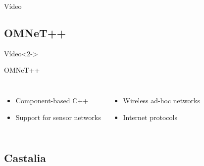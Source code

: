 \documentclass{beamer}
\begin{document}
\begin{frame}

\begin{exampleblock}{Vídeo}
	\centering
\end{exampleblock}
\end{frame}


\subsection{OMNeT++}

\begin{frame}

\begin{exampleblock}{Vídeo}<2->
	\centering
\end{exampleblock}

\begin{block}{OMNeT++}

\begin{columns}[c] %

	\begin{itemize}
		\item Component-based C++
		\item Support for sensor networks
	\end{itemize}
\begin{itemize}
		\item Wireless ad-hoc networks
		\item Internet protocols
	\end{itemize}
\end{columns}
\end{block}
\end{frame}

\subsection{Castalia}
\end{document}
